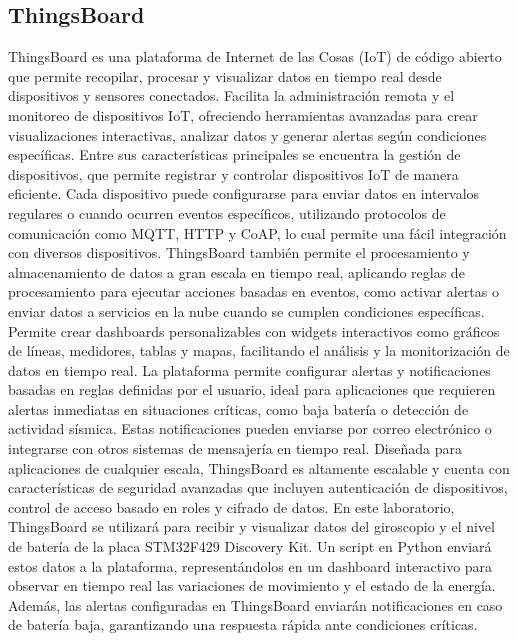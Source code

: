 \subsection{ThingsBoard}
ThingsBoard es una plataforma de Internet de las Cosas (IoT) de código abierto que permite recopilar, procesar y visualizar datos en tiempo real desde dispositivos y sensores conectados. Facilita la administración remota y el monitoreo de dispositivos IoT, ofreciendo herramientas avanzadas para crear visualizaciones interactivas, analizar datos y generar alertas según condiciones específicas.
Entre sus características principales se encuentra la gestión de dispositivos, que permite registrar y controlar dispositivos IoT de manera eficiente. Cada dispositivo puede configurarse para enviar datos en intervalos regulares o cuando ocurren eventos específicos, utilizando protocolos de comunicación como MQTT, HTTP y CoAP, lo cual permite una fácil integración con diversos dispositivos.
ThingsBoard también permite el procesamiento y almacenamiento de datos a gran escala en tiempo real, aplicando reglas de procesamiento para ejecutar acciones basadas en eventos, como activar alertas o enviar datos a servicios en la nube cuando se cumplen condiciones específicas. Permite crear dashboards personalizables con widgets interactivos como gráficos de líneas, medidores, tablas y mapas, facilitando el análisis y la monitorización de datos en tiempo real.
La plataforma permite configurar alertas y notificaciones basadas en reglas definidas por el usuario, ideal para aplicaciones que requieren alertas inmediatas en situaciones críticas, como baja batería o detección de actividad sísmica. Estas notificaciones pueden enviarse por correo electrónico o integrarse con otros sistemas de mensajería en tiempo real.
Diseñada para aplicaciones de cualquier escala, ThingsBoard es altamente escalable y cuenta con características de seguridad avanzadas que incluyen autenticación de dispositivos, control de acceso basado en roles y cifrado de datos. \cite{things}
En este laboratorio, ThingsBoard se utilizará para recibir y visualizar datos del giroscopio y el nivel de batería de la placa STM32F429 Discovery Kit. Un script en Python enviará estos datos a la plataforma, representándolos en un dashboard interactivo para observar en tiempo real las variaciones de movimiento y el estado de la energía. Además, las alertas configuradas en ThingsBoard enviarán notificaciones en caso de batería baja, garantizando una respuesta rápida ante condiciones críticas.



